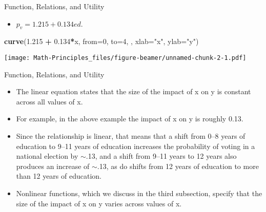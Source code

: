 \documentclass[
  ignorenonframetext,
]{beamer}
\newenvironment{Shaded}{\begin{snugshade}}{\end{snugshade}}
\newcommand{\DataTypeTok}[1]{\textcolor[rgb]{0.13,0.29,0.53}{#1}}
\newcommand{\DecValTok}[1]{\textcolor[rgb]{0.00,0.00,0.81}{#1}}
\newcommand{\FloatTok}[1]{\textcolor[rgb]{0.00,0.00,0.81}{#1}}
\newcommand{\KeywordTok}[1]{\textcolor[rgb]{0.13,0.29,0.53}{\textbf{#1}}}
\newcommand{\NormalTok}[1]{#1}
\newcommand{\OperatorTok}[1]{\textcolor[rgb]{0.81,0.36,0.00}{\textbf{#1}}}
\newcommand{\StringTok}[1]{\textcolor[rgb]{0.31,0.60,0.02}{#1}}
\providecommand{\tightlist}{%
  \setlength{\itemsep}{0pt}\setlength{\parskip}{0pt}}
\begin{document}
\begin{frame}[fragile]{Function, Relations, and Utility}
\protect\hypertarget{function-relations-and-utility-8}{}

\begin{itemize}
\tightlist
\item
  \(p_{v} = 1.215 + 0.134ed\).
\end{itemize}

\begin{Shaded}
\begin{Highlighting}[]
\KeywordTok{curve}\NormalTok{(}\FloatTok{1.215} \OperatorTok{+}\StringTok{ }\FloatTok{0.134}\OperatorTok{*}\NormalTok{x, }\DataTypeTok{from=}\DecValTok{0}\NormalTok{, }\DataTypeTok{to=}\DecValTok{4}\NormalTok{, , }\DataTypeTok{xlab=}\StringTok{"x"}\NormalTok{, }\DataTypeTok{ylab=}\StringTok{"y"}\NormalTok{)}
\end{Highlighting}
\end{Shaded}

\texttt{[image: Math-Principles\_files/figure-beamer/unnamed-chunk-2-1.pdf]}

\end{frame}

\begin{frame}{Function, Relations, and Utility}
\protect\hypertarget{function-relations-and-utility-9}{}

\begin{itemize}
\item
  The linear equation states that the size of the impact of x on y is
  constant across all values of x.
\item
  For example, in the above example the impact of x on y is roughly
  0.13.
\item
  Since the relationship is linear, that means that a shift from 0--8
  years of education to 9--11 years of education increases the
  probability of voting in a national election by \(\sim\).13, and a
  shift from 9--11 years to 12 years also produces an increase of
  \(\sim\).13, as do shifts from 12 years of education to more than 12
  years of education.
\item
  Nonlinear functions, which we discuss in the third subsection, specify
  that the size of the impact of x on y varies across values of x.
\end{itemize}

\end{frame}
\end{document}
